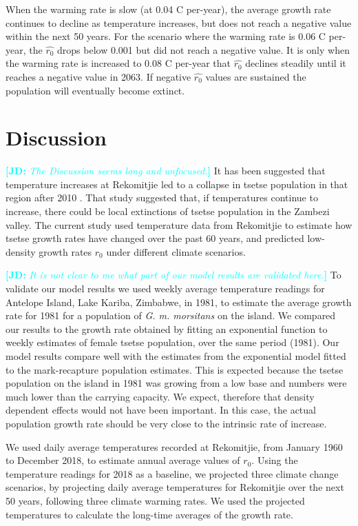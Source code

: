 \documentclass[12pt,a4paper]{article}
\newcommand{\comment}[3]{\textcolor{#1}{\textbf{[#2: }\textsl{#3}\textbf{]}}}
\newcommand{\jd}[1]{\comment{cyan}{JD}{#1}}
\begin{document}
When the warming rate is slow (at 0.04 \textdegree C per-year), the average growth rate continues to decline as temperature increases, but does not reach a negative value within the next 50 years. For the scenario where the warming rate is 0.06 \textdegree C per-year, the $\hat{r_0}$ drops below 0.001 but did not reach a negative value. It is only when the warming rate is increased to 0.08 \textdegree C per-year that $\hat{r_0}$ declines steadily until it reaches a negative value in 2063. If negative $\hat{r_0}$ values are sustained the population will eventually become extinct.


\section*{Discussion}

\jd{The Discussion seems long and unfocused.} 
It has been suggested that temperature increases at Rekomitjie led to a collapse in tsetse population in that region after 2010 \cite{Lord2018}. That study suggested that, if temperatures continue to increase, there could be local extinctions of tsetse population in the Zambezi valley.  The current study used temperature data from Rekomitjie to estimate how tsetse growth rates have changed over the past 60 years, and predicted low-density growth rates $r_0$ under different climate scenarios.  

\jd{It is not clear to me what part of our model results are validated here.} To validate our model results we used weekly average temperature readings for Antelope Island, Lake Kariba, Zimbabwe, in 1981, to estimate the average growth rate for 1981 for a population of \textit{G. m. morsitans} on the island. We compared our results to the growth rate obtained by fitting an exponential function to weekly estimates of female tsetse population, over the same period (1981). Our model results compare well with the estimates from the exponential model fitted to the mark-recapture population estimates. This is expected because the tsetse population on the island in 1981 was growing from a low base and numbers were much lower than the carrying capacity. We expect, therefore that density dependent effects would not have been important. In this case, the actual population growth rate should be very close to the intrinsic rate of increase.

We used daily average temperatures recorded at Rekomitjie, from January 1960 to December 2018, to estimate annual average values of $r_0$. Using the temperature readings for 2018 as a baseline, we projected three climate change scenarios, by projecting daily average temperatures for Rekomitjie over the next 50 years, following three climate warming rates. We used the projected temperatures to calculate the long-time averages of the growth rate. 
\end{document}
